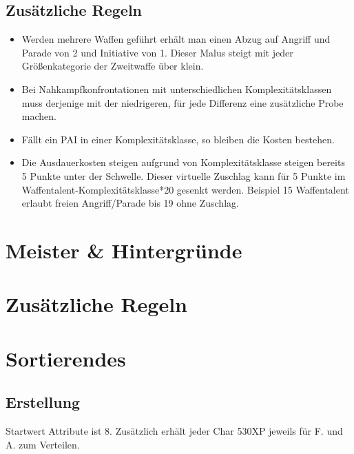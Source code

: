 \documentclass[a4paper,12pt,oneside]{book}
\begin{document}
\chapter{Zusätzliche Regeln}
\begin{itemize}
\item Werden mehrere Waffen geführt erhält man einen Abzug auf Angriff und Parade von 2 und Initiative von 1. Dieser Malus steigt mit jeder Größenkategorie der Zweitwaffe über klein.
\item Bei Nahkampfkonfrontationen mit unterschiedlichen Komplexitätsklassen muss derjenige mit der niedrigeren, für jede Differenz eine zusätzliche Probe machen.
\item Fällt ein PAI in einer Komplexitätsklasse, so bleiben die Kosten bestehen.
\item Die Ausdauerkosten steigen aufgrund von Komplexitätsklasse steigen bereits 5 Punkte unter der Schwelle. Dieser virtuelle Zuschlag kann für 5 Punkte im Waffentalent-Komplexitätsklasse*20 gesenkt werden. Beispiel 15 Waffentalent erlaubt freien Angriff/Parade bis 19 ohne Zuschlag.
\end{itemize} 
\part{Meister \& Hintergründe}
\setcounter{chapter}{0}
\part{Zusätzliche Regeln}
\setcounter{chapter}{0}

\part{Sortierendes}
\chapter{Erstellung}
Startwert Attribute ist 8.
Zusätzlich erhält jeder Char 530XP jeweils für F. und A. zum Verteilen.
\end{document}
